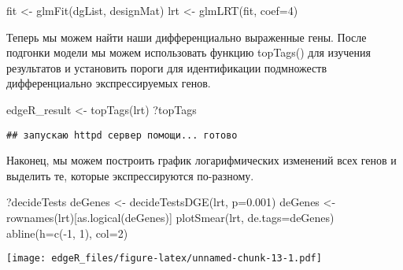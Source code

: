 \documentclass[
]{article}
\newenvironment{Shaded}{\begin{snugshade}}{\end{snugshade}}
\newcommand{\AttributeTok}[1]{\textcolor[rgb]{0.77,0.63,0.00}{#1}}
\newcommand{\DecValTok}[1]{\textcolor[rgb]{0.00,0.00,0.81}{#1}}
\newcommand{\FloatTok}[1]{\textcolor[rgb]{0.00,0.00,0.81}{#1}}
\newcommand{\FunctionTok}[1]{\textcolor[rgb]{0.00,0.00,0.00}{#1}}
\newcommand{\NormalTok}[1]{#1}
\newcommand{\OtherTok}[1]{\textcolor[rgb]{0.56,0.35,0.01}{#1}}
\newcommand{\SpecialCharTok}[1]{\textcolor[rgb]{0.00,0.00,0.00}{#1}}
\begin{document}
\begin{Shaded}
\begin{Highlighting}[]
\NormalTok{fit }\OtherTok{\textless{}{-}} \FunctionTok{glmFit}\NormalTok{(dgList, designMat)}
\NormalTok{lrt }\OtherTok{\textless{}{-}} \FunctionTok{glmLRT}\NormalTok{(fit, }\AttributeTok{coef=}\DecValTok{4}\NormalTok{)}
\end{Highlighting}
\end{Shaded}

Теперь мы можем найти наши дифференциально выраженные гены. После
подгонки модели мы можем использовать функцию topTags() для изучения
результатов и установить пороги для идентификации подмножеств
дифференциально экспрессируемых генов.

\begin{Shaded}
\begin{Highlighting}[]
\NormalTok{edgeR\_result }\OtherTok{\textless{}{-}} \FunctionTok{topTags}\NormalTok{(lrt)}
\NormalTok{?topTags}
\end{Highlighting}
\end{Shaded}

\begin{verbatim}
## запускаю httpd сервер помощи... готово
\end{verbatim}

Наконец, мы можем построить график логарифмических изменений всех генов
и выделить те, которые экспрессируются по-разному.

\begin{Shaded}
\begin{Highlighting}[]
\NormalTok{?decideTests}
\NormalTok{deGenes }\OtherTok{\textless{}{-}} \FunctionTok{decideTestsDGE}\NormalTok{(lrt, }\AttributeTok{p=}\FloatTok{0.001}\NormalTok{)}
\NormalTok{deGenes }\OtherTok{\textless{}{-}} \FunctionTok{rownames}\NormalTok{(lrt)[}\FunctionTok{as.logical}\NormalTok{(deGenes)]}
\FunctionTok{plotSmear}\NormalTok{(lrt, }\AttributeTok{de.tags=}\NormalTok{deGenes)}
\FunctionTok{abline}\NormalTok{(}\AttributeTok{h=}\FunctionTok{c}\NormalTok{(}\SpecialCharTok{{-}}\DecValTok{1}\NormalTok{, }\DecValTok{1}\NormalTok{), }\AttributeTok{col=}\DecValTok{2}\NormalTok{)}
\end{Highlighting}
\end{Shaded}

\texttt{[image: edgeR\_files/figure-latex/unnamed-chunk-13-1.pdf]}
\end{document}
